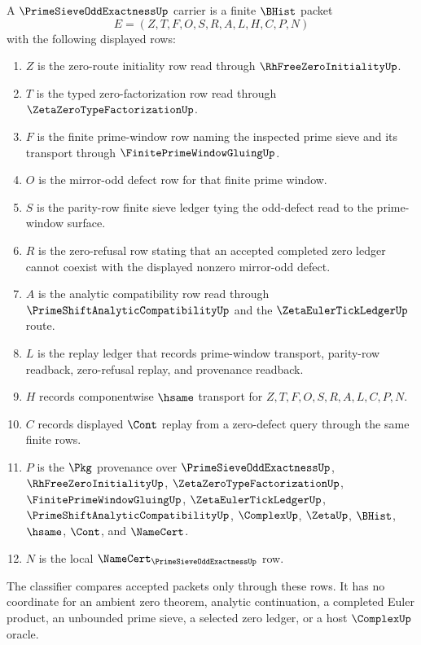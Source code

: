 \begin{definition}
\label{def:prime-sieve-odd-exactness-carrier}
A $\PrimeSieveOddExactnessUp$ carrier is a finite $\BHist$ packet
$$
E=(Z,T,F,O,S,R,A,L,H,C,P,N)
$$
with the following displayed rows:
\begin{enumerate}
\item $Z$ is the zero-route initiality row read through $\RhFreeZeroInitialityUp$.
\item $T$ is the typed zero-factorization row read through $\ZetaZeroTypeFactorizationUp$.
\item $F$ is the finite prime-window row naming the inspected prime sieve and its transport through $\FinitePrimeWindowGluingUp$.
\item $O$ is the mirror-odd defect row for that finite prime window.
\item $S$ is the parity-row finite sieve ledger tying the odd-defect read to the prime-window surface.
\item $R$ is the zero-refusal row stating that an accepted completed zero ledger cannot coexist with the displayed nonzero mirror-odd defect.
\item $A$ is the analytic compatibility row read through $\PrimeShiftAnalyticCompatibilityUp$ and the $\ZetaEulerTickLedgerUp$ route.
\item $L$ is the replay ledger that records prime-window transport, parity-row readback, zero-refusal replay, and provenance readback.
\item $H$ records componentwise $\hsame$ transport for $Z,T,F,O,S,R,A,L,C,P,N$.
\item $C$ records displayed $\Cont$ replay from a zero-defect query through the same finite rows.
\item $P$ is the $\Pkg$ provenance over $\PrimeSieveOddExactnessUp$, $\RhFreeZeroInitialityUp$, $\ZetaZeroTypeFactorizationUp$, $\FinitePrimeWindowGluingUp$, $\ZetaEulerTickLedgerUp$, $\PrimeShiftAnalyticCompatibilityUp$, $\ComplexUp$, $\ZetaUp$, $\BHist$, $\hsame$, $\Cont$, and $\NameCert$.
\item $N$ is the local $\NameCert_{\PrimeSieveOddExactnessUp}$ row.
\end{enumerate}
The classifier compares accepted packets only through these rows. It has no coordinate for an ambient zero theorem, analytic continuation, a completed Euler product, an unbounded prime sieve, a selected zero ledger, or a host $\ComplexUp$ oracle.
\end{definition}

